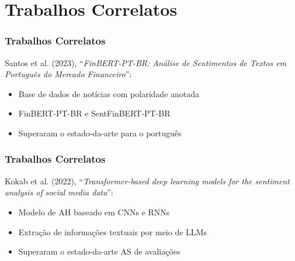 \section{Trabalhos Correlatos} %


\begin{frame}
    \frametitle{Trabalhos Correlatos}
    Santos et al. (2023), ``\textit{FinBERT-PT-BR: Análise de Sentimentos de Textos em Português do Mercado Financeiro}'':
    \begin{itemize}
        \item Base de dados de notícias com polaridade anotada
        \item FinBERT-PT-BR e SentFinBERT-PT-BR
        \item Superaram o estado-da-arte para o português
    \end{itemize}
	
\end{frame}


\begin{frame}
	\frametitle{Trabalhos Correlatos}
    Kokab et al. (2022), ``\textit{Transformer-based deep learning models for the sentiment analysis of social media data}'':
    \begin{itemize}
        \item Modelo de AH baseado em CNNs e RNNs
        \item Extração de informações textuais por meio de LLMs
        \item Superaram o estado-da-arte AS de avaliações
    \end{itemize}
	
\end{frame}

